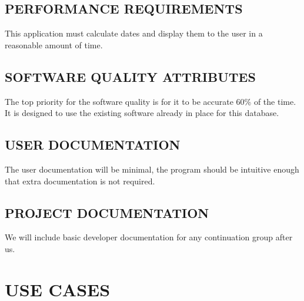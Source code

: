 \documentclass[11pt]{article}
\begin{document}
\subsection{PERFORMANCE REQUIREMENTS}
This application must calculate dates and display them to the user in a reasonable amount of time.
\subsection{SOFTWARE QUALITY ATTRIBUTES}
The top priority for the software quality is for it to be accurate 60\% of the time. It is designed to use the existing software already in place for this database. 
\subsection{USER DOCUMENTATION}
The user documentation will be minimal, the program should be intuitive enough that extra documentation is not required.
\subsection{PROJECT DOCUMENTATION}
We will include basic developer documentation for any continuation group after us.
\newpage

\section{USE CASES}

%
\end{document}
